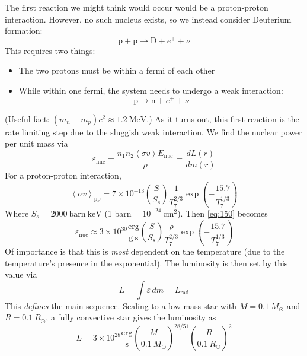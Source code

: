 \documentclass[10pt]{article}
\numberwithin{equation}{section}
\newcommand{\n}{\noindent}
\newcommand{\avg}[1]{\left\langle#1\right\rangle}
\begin{document}
  \n The first reaction we might think would occur would be a
  proton-proton interaction. However, no such nucleus exists, so we
  instead consider Deuterium formation:
  \begin{equation}
    \label{eq:148}
    \mathrm{p+p\to D}+e^++\nu
  \end{equation}
  This requires two things:
  \begin{itemize}
  \item The two protons must be within a fermi of each
    other
  \item While within one fermi, the system needs to undergo a weak
    interaction:
    \begin{equation}
      \label{eq:149}
      \mathrm{p\to n+}e^++\nu
    \end{equation}
  \end{itemize}
  (Useful fact: $(m_n-m_p)c^2\approx 1.2\ \mathrm{MeV}$.) As it turns
  out, this first reaction is the rate limiting step due to the
  sluggish weak interaction. We find the nuclear power per unit mass
  via
  \begin{equation}
    \label{eq:150}
    \varepsilon_{\mathrm{nuc}}=\frac{n_1n_2\avg{\sigma v}E_{\mathrm{nuc}}}
{\rho}=\frac{dL(r)}{dm(r)}
  \end{equation}
  For a proton-proton interaction,
  \begin{equation}
    \label{eq:151}
    \avg{\sigma v}_{\mathrm{pp}}=7\times 10^{-13}\left(\frac{S}{S_s}\right)
\frac{1}{T_7^{2/3}}\exp\left(-\frac{15.7}{T_7^{1/3}}\right)
  \end{equation}
  Where $S_s=2000\ \mathrm{barn\ keV}$ (1 barn$=10^{-24}\
  \mathrm{cm^2}$). Then \eqref{eq:150} becomes
  \begin{equation}
    \label{eq:152}
    \varepsilon_{\mathrm{nuc}}\approx 3\times
    10^{30}\frac{\mathrm{erg}}{\mathrm{g\ s}}\left(\frac{S}{S_s}\right)
\frac{\rho}{T_7^{2/3}}\exp\left(-\frac{15.7}{T_7^{1/3}}\right)
  \end{equation}
  Of importance is that this is \emph{most} dependent on the
  temperature (due to the temperature's presence in the
  exponential). The luminosity is then set by this value via
  \begin{equation}
    \label{eq:153}
    L=\int \varepsilon\,dm=L_{\mathrm{rad}}
  \end{equation}
  This \emph{defines} the main sequence. Scaling to a low-mass star
  with $M=0.1\ M_\odot$ and $R=0.1\ R_\odot$, a fully convective star
  gives the luminosity as
  \begin{equation}
    \label{eq:154}
    L=3\times
    10^{28}\frac{\mathrm{erg}}{\mathrm{s}}\left(\frac{M}{0.1\
        M_\odot}\right)^{28/51}\left(\frac{R}{0.1\ R_\odot}\right)^2
  \end{equation}
\end{document}

